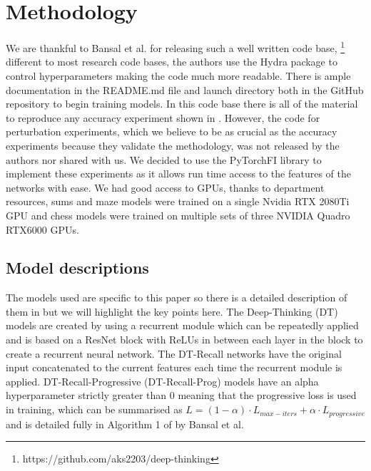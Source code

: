 
\section{Methodology}
We are thankful to Bansal et al. for releasing such a well written code base, \footnote{https://github.com/aks2203/deep-thinking} different to most research code bases, the authors use the Hydra package \cite{Yadan2019Hydra} to control hyperparameters making the code much more readable. There is ample documentation in the README.md file and launch directory both in the GitHub repository to begin training models. In this code base there is all of the material to reproduce any accuracy experiment shown in \cite{bansal2022endtoend}. However, the code for perturbation experiments, which we believe to be as crucial as the accuracy experiments because they validate the methodology, was not released by the authors nor shared with us. We decided to use the PyTorchFI \cite{PytorchFIMahmoudAggarwalDSML20} library to implement these experiments as it allows run time access to the features of the networks with ease. We had good access to GPUs, thanks to department resources, sums and maze models were trained on a single Nvidia RTX 2080Ti GPU and chess models were trained on multiple sets of three NVIDIA Quadro RTX6000 GPUs.

\subsection{Model descriptions}
The models used are specific to this paper so there is a detailed description of them in \cite{bansal2022endtoend} but we will highlight the key points here. The Deep-Thinking (DT) models are created by using a recurrent module which can be repeatedly applied and is based on a ResNet block \cite{he2016deep} with ReLUs in between each layer in the block to create a recurrent neural network. The DT-Recall networks have the original input concatenated to the current features each time the recurrent module is applied. DT-Recall-Progressive (DT-Recall-Prog) models have an alpha hyperparameter strictly greater than 0 meaning that the progressive loss is used in training, which can be summarised as 
\(L=(1-\alpha)\cdot L_{max-iters}+\alpha \cdot L_{progressive}\) and is detailed fully in Algorithm 1 of \cite{bansal2022endtoend} by Bansal et al.

